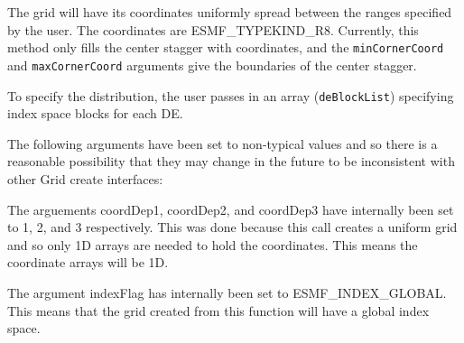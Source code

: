    The grid will have its coordinates uniformly spread between the
   ranges specified by the user. The coordinates are ESMF\_TYPEKIND\_R8.
   Currently, this method only fills the center stagger with coordinates, and
   the {\tt minCornerCoord} and {\tt maxCornerCoord} arguments give the boundaries of
   the center stagger.
  
   To specify the distribution, the user passes in an array
   ({\tt deBlockList}) specifying index space blocks for each DE.
  
    The following arguments have been set to non-typical values and so
    there is a reasonable possibility that they may change in the future
    to be inconsistent with other Grid create interfaces:
  
    The arguements coordDep1, coordDep2, and coordDep3 have internally
    been set to 1, 2, and 3 respectively.
    This was done because this call creates a uniform grid and so only 1D arrays
    are needed to hold the coordinates. This means the coordinate arrays
    will be 1D.
  
    The argument indexFlag has internally been set to ESMF\_INDEX\_GLOBAL. This
    means that the grid created from this function will have a global index space.
  

